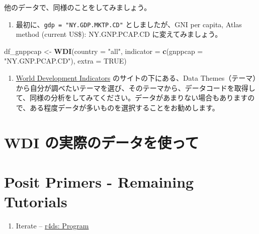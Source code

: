 \documentclass[
  xelatex, ja=standard]{bxjsbook}
\newenvironment{Shaded}{\begin{snugshade}}{\end{snugshade}}
\newcommand{\AttributeTok}[1]{\textcolor[rgb]{0.13,0.29,0.53}{#1}}
\newcommand{\ConstantTok}[1]{\textcolor[rgb]{0.56,0.35,0.01}{#1}}
\newcommand{\FunctionTok}[1]{\textcolor[rgb]{0.13,0.29,0.53}{\textbf{#1}}}
\newcommand{\NormalTok}[1]{#1}
\newcommand{\OtherTok}[1]{\textcolor[rgb]{0.56,0.35,0.01}{#1}}
\newcommand{\StringTok}[1]{\textcolor[rgb]{0.31,0.60,0.02}{#1}}
\providecommand{\tightlist}{%
  \setlength{\itemsep}{0pt}\setlength{\parskip}{0pt}}
\theoremstyle{definition}
\theoremstyle{definition}
\theoremstyle{definition}
\theoremstyle{definition}
\theoremstyle{remark}
\begin{document}
他のデータで、同様のことをしてみましょう。

\begin{enumerate}
\def\labelenumi{\arabic{enumi}.}
\tightlist
\item
  最初に、\texttt{gdp\ =\ "NY.GDP.MKTP.CD"} としましたが、GNI per capita, Atlas method (current US\$): NY.GNP.PCAP.CD に変えてみましょう。
\end{enumerate}

\begin{Shaded}
\begin{Highlighting}[]
\NormalTok{df\_gnppcap }\OtherTok{\textless{}{-}} \FunctionTok{WDI}\NormalTok{(}\AttributeTok{country =} \StringTok{"all"}\NormalTok{, }
              \AttributeTok{indicator =} \FunctionTok{c}\NormalTok{(}\AttributeTok{gnppcap =} \StringTok{"NY.GNP.PCAP.CD"}\NormalTok{), }
              \AttributeTok{extra =} \ConstantTok{TRUE}\NormalTok{)}
\end{Highlighting}
\end{Shaded}

\begin{enumerate}
\def\labelenumi{\arabic{enumi}.}
\setcounter{enumi}{1}
\tightlist
\item
  \href{https://datatopics.worldbank.org/world-development-indicators/}{World Development Indicators} のサイトの下にある、Data Themes（テーマ）から自分が調べたいテーマを選び、そのテーマから、データコードを取得して、同様の分析をしてみてください。データがあまりない場合もありますので、ある程度データが多いものを選択することをお勧めします。
\end{enumerate}

\hypertarget{wdi-ux306eux5b9fux969bux306eux30c7ux30fcux30bfux3092ux4f7fux3063ux3066}{%
\section{WDI の実際のデータを使って}\label{wdi-ux306eux5b9fux969bux306eux30c7ux30fcux30bfux3092ux4f7fux3063ux3066}}

\hypertarget{posit-primers---remaining-tutorials}{%
\section{Posit Primers - Remaining Tutorials}\label{posit-primers---remaining-tutorials}}

\begin{enumerate}
\def\labelenumi{\arabic{enumi}.}
\setcounter{enumi}{4}
\tightlist
\item
  Iterate -- \href{https://r4ds.had.co.nz/program-intro.html\#program-intro}{r4ds: Program}
\end{enumerate}
\end{document}
